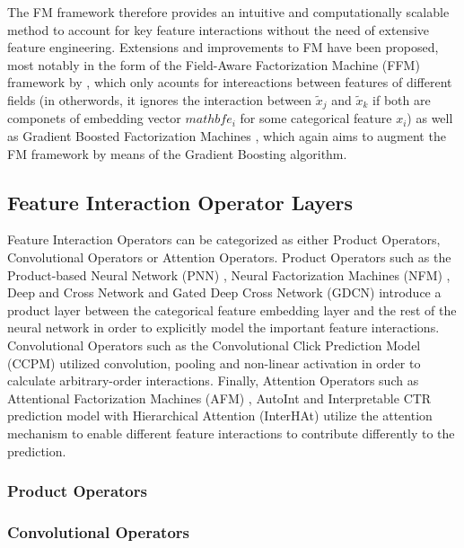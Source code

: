 \documentclass{mldsmsc}
\begin{document}
The FM framework therefore provides an intuitive and computationally scalable method to
account for key feature interactions without the need of extensive feature engineering. Extensions
and improvements to FM have been proposed, most notably in the form of
the Field-Aware Factorization Machine (FFM) framework by \cite{RefWorks:juan2016field-aware},
which only acounts for intereactions between features of different fields 
(in otherwords, it ignores the interaction between $\tilde{x}_j$ and $\tilde{x}_k$ if
both are componets of embedding vector $mathbf{e}_i$ for some categorical feature $x_i$)
as well as Gradient Boosted Factorization Machines \citep{RefWorks:cheng2014gradient}, 
which again aims to augment the FM framework by means of the Gradient Boosting algorithm.

\subsection{Feature Interaction Operator Layers}

Feature Interaction Operators can be categorized as either Product Operators, Convolutional Operators or 
Attention Operators. Product Operators such as the Product-based Neural Network (PNN) \citep{RefWorks:qu2016product-based}, 
Neural Factorization Machines (NFM) \citep{RefWorks:he2017neural}, Deep and Cross Network \citep{RefWorks:wang2017deep} and 
Gated Deep Cross Network (GDCN) \citep{RefWorks:wang2023deeper} introduce a product layer between the categorical 
feature embedding layer and the rest of the neural network in order to explicitly model the important feature 
interactions. Convolutional Operators such as the Convolutional Click Prediction Model (CCPM) \citep{RefWorks:liu2015convolutional} 
utilized convolution, pooling and non-linear activation in order to calculate arbitrary-order interactions. 
Finally, Attention Operators such as Attentional Factorization Machines (AFM) \citep{RefWorks:xiao2017attentional}, AutoInt 
\cite{RefWorks:song2019autoint} and Interpretable CTR prediction model with Hierarchical Attention (InterHAt) \citep{RefWorks:li2020interpretable}
utilize the attention mechanism to enable different feature interactions to contribute differently to the 
prediction.

\subsubsection{Product Operators}

\subsubsection{Convolutional Operators}
\end{document}
